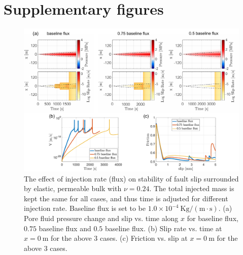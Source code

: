\section{Supplementary figures}
\begin{figure}[htbp]
    \centering
    \includegraphics[width=1.0\textwidth]{figures/flux_elast_0.24.pdf}
    \caption{The effect of injection rate (flux) on stability of fault slip surrounded by elastic, permeable bulk with $\nu = 0.24$. 
    The total injected mass is kept the same for all cases, 
    and thus time is adjusted for different injection rate. 
    Baseline flux is set to be $1.0\times10^{-4}\ \mathrm{Kg / (m \cdot s)}$.
    (a) Pore fluid pressure change and slip vs. time along $x$ for baseline flux, $0.75$ baseline flux and $0.5$ baseline flux. 
    (b) Slip rate vs. time at $x = 0\ \mathrm{m}$ for the above 3 cases. 
    (c) Friction vs. slip at $x = 0\ \mathrm{m}$ for the above 3 cases.}
    \label{fig:fluxElas0.24}
\end{figure}

